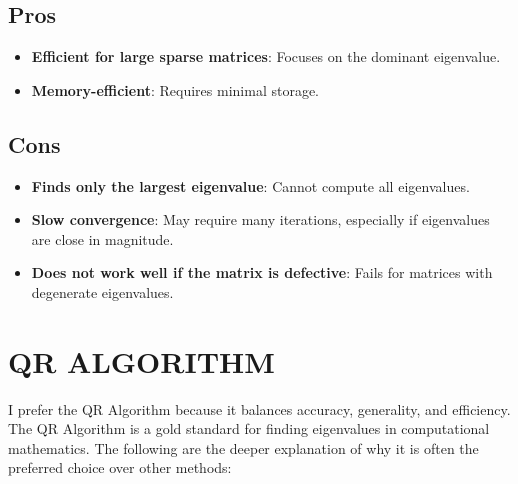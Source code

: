 \documentclass[journal]{IEEEtran}
\begin{document}
\subsection*{Pros}
\begin{itemize}
    \item \textbf{Efficient for large sparse matrices}: Focuses on the dominant eigenvalue.
    \item \textbf{Memory-efficient}: Requires minimal storage.
\end{itemize}

\subsection*{Cons}
\begin{itemize}
    \item \textbf{Finds only the largest eigenvalue}: Cannot compute all eigenvalues.
    \item \textbf{Slow convergence}: May require many iterations, especially if eigenvalues are close in magnitude.
    \item \textbf{Does not work well if the matrix is defective}: Fails for matrices with degenerate eigenvalues.
\end{itemize}

\section{QR ALGORITHM}

I prefer the QR Algorithm because it balances accuracy, generality, and efficiency. The QR Algorithm is a gold standard for finding eigenvalues in computational mathematics. The following are the deeper explanation of why it is often the preferred choice over other methods: \\
\end{document}
